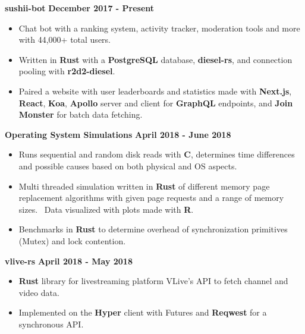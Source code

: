 \documentclass{res}
\begin{document}
\begin{resume}
		{\bf sushii-bot} \hfill {\bf December 2017 - Present} \\
			\vspace{-3.5mm}
			\begin{itemize} \itemsep -2pt
				\item Chat bot with a ranking system, activity tracker, moderation tools and more with 44,000+ total users.
				\item Written in {\bf Rust} with a {\bf PostgreSQL} database, {\bf diesel-rs}, and connection pooling with {\bf r2d2-diesel}.
				\item Paired a website with user leaderboards and statistics made with {\bf Next.js}, {\bf React}, {\bf Koa}, {\bf Apollo} server and client for {\bf GraphQL} endpoints,
					and {\bf Join Monster} for batch data fetching.
			\end{itemize}
		{\bf Operating System Simulations} \hfill {\bf April 2018 - June 2018} \\
			\vspace{-3.5mm}
			\begin{itemize} \itemsep -2pt
				\item Runs sequential and random disk reads with {\bf C}, determines time differences and possible causes based on both physical and OS aspects.
				\item Multi threaded simulation written in {\bf Rust} of different memory page replacement algorithms with given page requests and a range of memory sizes. \
				Data visualized with plots made with {\bf R}.
				\item Benchmarks in {\bf Rust} to determine overhead of synchronization primitives (Mutex) and lock contention.
			\end{itemize}		
		{\bf vlive-rs} \hfill {\bf April 2018 - May 2018} \\
			\vspace{-3.5mm}
			\begin{itemize} \itemsep -2pt
				\item {\bf Rust} library for livestreaming platform VLive's API to fetch channel and video data.
				\item Implemented on the {\bf Hyper} client with Futures and {\bf Reqwest} for a synchronous API.
			\end{itemize}
	\end{resume} 
\end{document}
